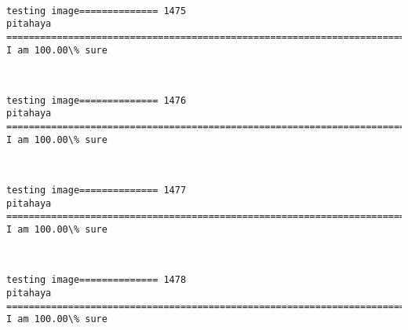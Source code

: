 \documentclass[11pt]{article}
\begin{document}
    \begin{center}
    \end{center}
    { \hspace*{\fill} \\}
    
    \begin{Verbatim}[commandchars=\\\{\}]
testing image============== 1475
pitahaya
============================================================================
I am 100.00\% sure

    \end{Verbatim}

    \begin{center}
    \end{center}
    { \hspace*{\fill} \\}
    
    \begin{Verbatim}[commandchars=\\\{\}]
testing image============== 1476
pitahaya
============================================================================
I am 100.00\% sure

    \end{Verbatim}

    \begin{center}
    \end{center}
    { \hspace*{\fill} \\}
    
    \begin{Verbatim}[commandchars=\\\{\}]
testing image============== 1477
pitahaya
============================================================================
I am 100.00\% sure

    \end{Verbatim}

    \begin{center}
    \end{center}
    { \hspace*{\fill} \\}
    
    \begin{Verbatim}[commandchars=\\\{\}]
testing image============== 1478
pitahaya
============================================================================
I am 100.00\% sure

    \end{Verbatim}
\end{document}
